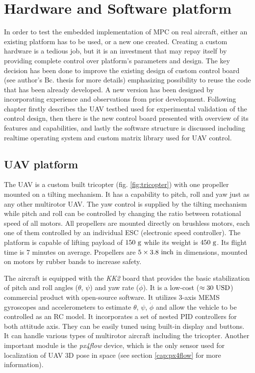 \section{Hardware and Software platform}
\label{cap:platform}

In order to test the embedded implementation of MPC on real aircraft, either an existing platform has to be used, or a new one created. Creating a custom hardware is a tedious job, but it is an investment that may repay itself by providing complete control over platform's parameters and design. The key decision has been done to improve the existing design of custom control board (see author's Bc. thesis \citep{baca2013} for more details) emphasizing possibility to reuse the code that has been already developed. A new version has been designed by incorporating experience and observations from prior development. Following chapter firstly describes the UAV testbed used for experimental validation of the control design, then there is the new control board presented with overview of its features and capabilities, and lastly the software structure is discussed including realtime operating system and custom matrix library used for UAV control.

\subsection{UAV platform}

The UAV is a custom built tricopter (fig. \ref{fig:tricopter}) with one propeller mounted on a tilting mechanism. It has a capability to pitch, roll and yaw just as any other multirotor UAV. The yaw control is supplied by the tilting mechanism while pitch and roll can be controlled by changing the ratio between rotational speed of all motors. All propellers are mounted directly on brushless motors, each one of them controlled by an individual ESC (electronic speed controller). The platform is capable of lifting payload of $150 ~\mathrm{g}$ while its weight is $450~\mathrm{g}$. Its flight time is 7 minutes on average. Propellers are $5\times3.8 ~\mathrm{inch}$ in dimensions, mounted on motors by rubber bands to increase safety.

The aircraft is equipped with the \textit{KK2} board that provides the basic stabilization of pitch and roll angles ($\theta$, $\psi$) and yaw rate ($\dot{\phi}$). It is a low-cost ($\approx 30~\mathrm{USD}$) commercial product with open-source software. It utilizes 3-axis MEMS gyroscopes and accelerometers to estimate $\theta$, $\psi$, $\dot{\phi}$ and allow the vehicle to be controlled as an RC model. It incorporates a set of nested PID controllers for both attitude axis. They can be easily tuned using built-in display and buttons. It can handle various types of multirotor aircraft including the tricopter. Another important module is the \textit{px4flow} device, which is the only sensor used for localization of UAV 3D pose in space (see section \ref{cap:px4flow} for more information).

